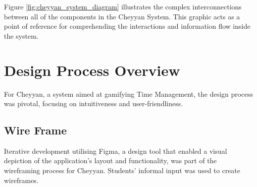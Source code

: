 \documentclass{l4proj}
\begin{document}
Figure \ref{fig:cheyyan_system_diagram} illustrates the complex interconnections between all of the components in the Cheyyan System. This graphic acts as a point of reference for comprehending the interactions and information flow inside the system.



\section{Design Process Overview}
For Cheyyan, a system aimed at gamifying Time Management, the design process was pivotal, focusing on intuitiveness and user-friendliness.

\subsection{Wire Frame}
Iterative development utilising Figma, a design tool that enabled a visual depiction of the application's layout and functionality, was part of the wireframing process for Cheyyan. Students' informal input was used to create wireframes.
\end{document}
